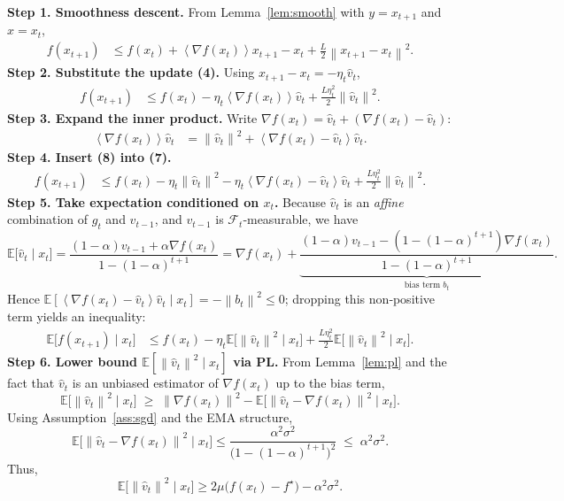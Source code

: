 \documentclass{article}
\newcommand{\E}{\mathbb{E}}
\newcommand{\norm}[1]{\left\lVert #1 \right\rVert}
\newcommand{\inner}[1]{\left\langle #1 \right\rangle}
\begin{document}
\noindent\textbf{Step 1. Smoothness descent.}  
From Lemma~\ref{lem:smooth} with $y=x_{t+1}$ and $x=x_t$,
\begin{align}
    f(x_{t+1})
    &\le f(x_t)+\inner{\nabla f(x_t)}{x_{t+1}-x_t}
      +\frac{L}{2}\norm{x_{t+1}-x_t}^2 .\tag{6}
\end{align}
\noindent\textbf{Step 2. Substitute the update (4).}  
Using $x_{t+1}-x_t=-\eta_t\hat v_t$,
\begin{align}
    f(x_{t+1})
    &\le f(x_t)-\eta_t\inner{\nabla f(x_t)}{\hat v_t}
      +\frac{L\eta_t^2}{2}\norm{\hat v_t}^2 .\tag{7}
\end{align}
\noindent\textbf{Step 3. Expand the inner product.}  
Write $\nabla f(x_t)=\hat v_t+(\nabla f(x_t)-\hat v_t)$:
\begin{align}
    \inner{\nabla f(x_t)}{\hat v_t}
    &=\norm{\hat v_t}^2+\inner{\nabla f(x_t)-\hat v_t}{\hat v_t}. \tag{8}
\end{align}
\noindent\textbf{Step 4. Insert (8) into (7).}
\begin{align}
    f(x_{t+1})
    &\le f(x_t)-\eta_t\norm{\hat v_t}^2
      -\eta_t\inner{\nabla f(x_t)-\hat v_t}{\hat v_t}
      +\frac{L\eta_t^2}{2}\norm{\hat v_t}^2 .\tag{9}
\end{align}
\noindent\textbf{Step 5. Take expectation conditioned on $x_t$.}  
Because $\hat v_t$ is an \emph{affine} combination of $g_t$ and $v_{t-1}$, and $v_{t-1}$ is $\mathcal{F}_t$‑measurable, we have
\[
    \E\!\bigl[\hat v_t\mid x_t\bigr]=\frac{(1-\alpha)v_{t-1}+\alpha\nabla f(x_t)}{1-(1-\alpha)^{t+1}}
    =\nabla f(x_t)+\underbrace{\frac{(1-\alpha)v_{t-1}-(1-(1-\alpha)^{t+1})\nabla f(x_t)}{1-(1-\alpha)^{t+1}}}_{\text{bias term }b_t}.
\]
Hence $\E[\inner{\nabla f(x_t)-\hat v_t}{\hat v_t}\mid x_t]=-\norm{b_t}^2\le0$; dropping this non‑positive term yields an inequality:
\begin{align}
    \E\!\bigl[f(x_{t+1})\mid x_t\bigr]
    &\le f(x_t)-\eta_t\E\!\bigl[\norm{\hat v_t}^2\mid x_t\bigr]
      +\frac{L\eta_t^2}{2}\E\!\bigl[\norm{\hat v_t}^2\mid x_t\bigr] .\tag{10}
\end{align}
\noindent\textbf{Step 6. Lower bound $\E[\norm{\hat v_t}^2\mid x_t]$ via PL.}  
From Lemma~\ref{lem:pl} and the fact that $\hat v_t$ is an unbiased estimator of $\nabla f(x_t)$ up to the bias term,
\[
    \E\!\bigl[\norm{\hat v_t}^2\mid x_t\bigr]
    \;\ge\;\norm{\nabla f(x_t)}^2 - \E\!\bigl[\norm{\hat v_t-\nabla f(x_t)}^2\mid x_t\bigr] .
\]
Using Assumption~\ref{ass:sgd} and the EMA structure,
\[
    \E\!\bigl[\norm{\hat v_t-\nabla f(x_t)}^2\mid x_t\bigr]\le\frac{\alpha^2\sigma^2}{\bigl(1-(1-\alpha)^{t+1}\bigr)^2}
    \;\le\;\alpha^2\sigma^2 .\tag{11}
\]
Thus,
\[
    \E\!\bigl[\norm{\hat v_t}^2\mid x_t\bigr]\ge 2\mu\bigl(f(x_t)-f^\star\bigr)-\alpha^2\sigma^2 .\tag{12}
\]
\end{document}
